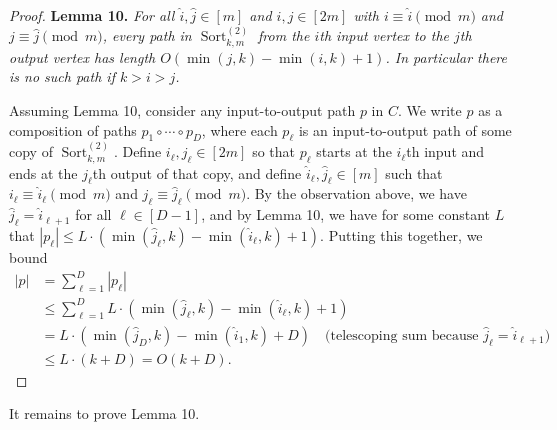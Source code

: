 \documentclass[10pt,a4paper]{article}
\newcommand{\Sort}{\operatorname{Sort}}
\newenvironment{originalresult}[1]{\par\medskip\noindent\textbf{#1.}\itshape}{\par\medskip}
\begin{document}
\begin{proof}
\begin{originalresult}{Lemma 10}
For all $\hat i,\hat j\in[m]$ and $i,j\in[2m]$ with $i\equiv\hat i\pmod m$ and $j\equiv\hat j\pmod m$, every path in $\Sort^{(2)}_{k,m}$ from the $i$th input vertex to the $j$th output vertex has length $O(\min(j,k)-\min(i,k)+1)$. In particular there is no such path if $k>i>j$.
\end{originalresult}
Assuming Lemma 10, consider any input-to-output path $p$ in $C$. We write $p$ as a composition of paths $p_1\circ\cdots\circ p_D$, where each $p_\ell$ is an input-to-output path of some copy of $\Sort^{(2)}_{k,m}$. Define $i_\ell,j_\ell\in[2m]$ so that $p_\ell$ starts at the $i_\ell$th input and ends at the $j_\ell$th output of that copy, and define $\hat i_\ell,\hat j_\ell\in[m]$ such that $i_\ell\equiv\hat i_\ell\pmod m$ and $j_\ell\equiv\hat j_\ell\pmod m$. By the observation above, we have $\hat j_\ell=\hat i_{\ell+1}$ for all $\ell\in[D-1]$, and by Lemma 10, we have for some constant $L$ that $|p_\ell|\le L\cdot(\min(\hat j_\ell,k)-\min(\hat i_\ell,k)+1)$.
Putting this together, we bound
\begin{align*}
|p|&=\sum_{\ell=1}^D|p_\ell|\\
&\le\sum_{\ell=1}^D L\cdot(\min(\hat j_\ell,k)-\min(\hat i_\ell,k)+1)\\
&=L\cdot(\min(\hat j_D,k)-\min(\hat i_1,k)+D)\quad\text{(telescoping sum because $\hat j_\ell=\hat i_{\ell+1}$)}\\
&\le L\cdot(k+D)=O(k+D).
\end{align*}
\end{proof}
It remains to prove Lemma 10.
\end{document}
